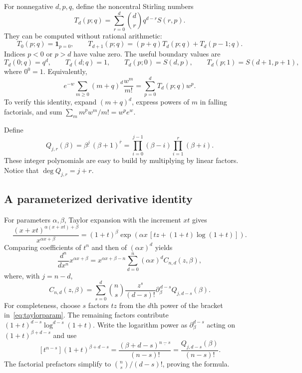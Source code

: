 \documentclass[11pt]{article}
\numberwithin{equation}{section}
\theoremstyle{definition}
\theoremstyle{remark}
\newcommand{\fall}[2]{#1^{\underline{#2}}}
\newcommand{\rise}[2]{#1^{\overline{#2}}}
\begin{document}
For nonnegative $d,p,q$, define the noncentral Stirling numbers
\begin{equation}\label{eq:Tdef}
 T_d(p;q)=\sum_{r=0}^d\binom dr q^{d-r}S(r,p).
\end{equation}
They can be computed without rational arithmetic:
\begin{equation}\label{eq:Trec}
 T_0(p;q)=\mathbf1_{p=0},\qquad
 T_{d+1}(p;q)=(p+q)T_d(p;q)+T_d(p-1;q).
\end{equation}
Indices $p<0$ or $p>d$ have value zero. The useful boundary values are
\[
 T_d(0;q)=q^d,\qquad T_d(d;q)=1,\qquad
 T_d(p;0)=S(d,p),\qquad T_d(p;1)=S(d+1,p+1),
\]
where $0^0=1$. Equivalently,
\begin{equation}\label{eq:Tmoment}
 e^{-w}\sum_{m\ge0}(m+q)^d\frac{w^m}{m!}
 =\sum_{p=0}^dT_d(p;q)w^p.
\end{equation}
To verify this identity, expand $(m+q)^d$, express powers of $m$ in falling
factorials, and sum $\sum_m\fall{m}{p}w^m/m!=w^pe^w$.

Define
\begin{equation}\label{eq:Qdef}
 Q_{j,r}(\beta)=\fall{\beta}{j}\,\rise{(\beta+1)}{r}
 =\prod_{i=0}^{j-1}(\beta-i)\prod_{i=1}^{r}(\beta+i).
\end{equation}
These integer polynomials are easy to build by multiplying by linear
factors. Notice that $\deg Q_{j,r}=j+r$.

\subsection{A parameterized derivative identity}

For parameters $\alpha,\beta$, Taylor expansion with the increment $xt$ gives
\begin{equation}\label{eq:taylorparam}
 \frac{(x+xt)^{\alpha(x+xt)+\beta}}{x^{\alpha x+\beta}}
 =(1+t)^\beta
 \exp\!\left(\alpha x\,[tz+(1+t)\log(1+t)]\right).
\end{equation}
Comparing coefficients of $t^n$ and then of $(\alpha x)^d$ yields
\begin{equation}\label{eq:parameteridentity}
 \frac{d^n}{dx^n}x^{\alpha x+\beta}
 =x^{\alpha x+\beta-n}\sum_{d=0}^n(\alpha x)^d
 C_{n,d}(z,\beta),
\end{equation}
where, with $j=n-d$,
\begin{equation}\label{eq:Cformula}
 C_{n,d}(z,\beta)
 =\sum_{s=0}^d\binom ns\frac{z^s}{(d-s)!}
 \partial_\beta^{\,d-s}Q_{j,d-s}(\beta).
\end{equation}
For completeness, choose $s$ factors $tz$ from the $d$th power of the bracket
in~\eqref{eq:taylorparam}. The remaining factors contribute
$(1+t)^{d-s}\log^{d-s}(1+t)$. Write the logarithm power as
$\partial_\beta^{d-s}$ acting on $(1+t)^{\beta+d-s}$ and use
\[
 [t^{n-s}](1+t)^{\beta+d-s}
 =\frac{\fall{(\beta+d-s)}{n-s}}{(n-s)!}
 =\frac{Q_{j,d-s}(\beta)}{(n-s)!}.
\]
The factorial prefactors simplify to $\binom ns/(d-s)!$, proving the formula.
\end{document}
